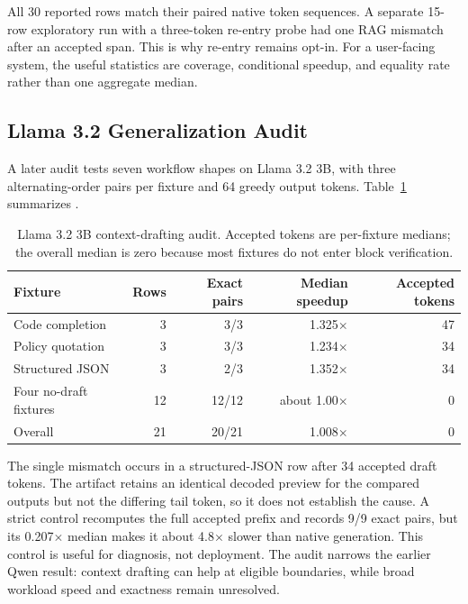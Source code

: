 \documentclass[11pt]{article}
\begin{document}
All 30 reported rows match their paired native token sequences. A separate 15-row exploratory run with a three-token re-entry probe had one RAG mismatch after an accepted span. This is why re-entry remains opt-in. For a user-facing system, the useful statistics are coverage, conditional speedup, and equality rate rather than one aggregate median.

\subsection{Llama 3.2 Generalization Audit}
A later audit tests seven workflow shapes on Llama 3.2 3B, with three alternating-order pairs per fixture and 64 greedy output tokens. Table~\ref{tab:llamaaudit} summarizes .

\begin{table}[H]
\centering
\small
\begin{tabular}{lrrrr}
\toprule
Fixture & Rows & Exact pairs & Median speedup & Accepted tokens \\
\midrule
Code completion & 3 & 3/3 & 1.325$\times$ & 47 \\
Policy quotation & 3 & 3/3 & 1.234$\times$ & 34 \\
Structured JSON & 3 & 2/3 & 1.352$\times$ & 34 \\
Four no-draft fixtures & 12 & 12/12 & about 1.00$\times$ & 0 \\
\midrule
Overall & 21 & 20/21 & 1.008$\times$ & 0 \\
\bottomrule
\end{tabular}
\caption{Llama 3.2 3B context-drafting audit. Accepted tokens are per-fixture medians; the overall median is zero because most fixtures do not enter block verification.}
\label{tab:llamaaudit}
\end{table}

The single mismatch occurs in a structured-JSON row after 34 accepted draft tokens. The artifact retains an identical decoded preview for the compared outputs but not the differing tail token, so it does not establish the cause. A strict control recomputes the full accepted prefix and records 9/9 exact pairs, but its 0.207$\times$ median makes it about 4.8$\times$ slower than native generation. This control is useful for diagnosis, not deployment. The audit narrows the earlier Qwen result: context drafting can help at eligible boundaries, while broad workload speed and exactness remain unresolved.
\end{document}
